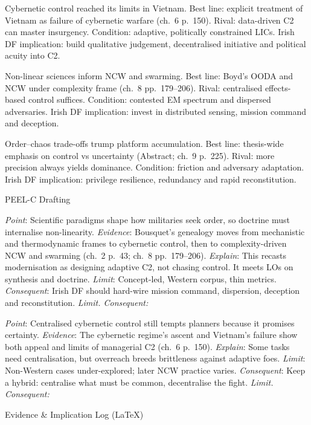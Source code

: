 Cybernetic control reached its limits in Vietnam.
Best line: explicit treatment of Vietnam as failure of cybernetic warfare (ch.~6 p.~150).
Rival: data-driven C2 can master insurgency.
Condition: adaptive, politically constrained LICs.
Irish DF implication: build qualitative judgement, decentralised initiative and political acuity into C2.

Non-linear sciences inform NCW and swarming.
Best line: Boyd’s OODA and NCW under complexity frame (ch.~8 pp.~179–206).
Rival: centralised effects-based control suffices.
Condition: contested EM spectrum and dispersed adversaries.
Irish DF implication: invest in distributed sensing, mission command and deception.

Order–chaos trade-offs trump platform accumulation.
Best line: thesis-wide emphasis on control vs uncertainty (Abstract; ch.~9 p.~225).
Rival: more precision always yields dominance.
Condition: friction and adversary adaptation.
Irish DF implication: privilege resilience, redundancy and rapid reconstitution.

PEEL-C Drafting

\textit{Point}: Scientific paradigms shape how militaries seek order, so doctrine must internalise non-linearity.
\textit{Evidence}: Bousquet’s genealogy moves from mechanistic and thermodynamic frames to cybernetic control, then to complexity-driven NCW and swarming (ch.~2 p.~43; ch.~8 pp.~179–206).
\textit{Explain}: This recasts modernisation as designing adaptive C2, not chasing control. It meets LOs on synthesis and doctrine.
\textit{Limit}: Concept-led, Western corpus, thin metrics.
\textit{Consequent}: Irish DF should hard-wire mission command, dispersion, deception and reconstitution.
\textit{Limit. Consequent:}

\textit{Point}: Centralised cybernetic control still tempts planners because it promises certainty.
\textit{Evidence}: The cybernetic regime’s ascent and Vietnam’s failure show both appeal and limits of managerial C2 (ch.~6 p.~150).
\textit{Explain}: Some tasks need centralisation, but overreach breeds brittleness against adaptive foes.
\textit{Limit}: Non-Western cases under-explored; later NCW practice varies.
\textit{Consequent}: Keep a hybrid: centralise what must be common, decentralise the fight.
\textit{Limit. Consequent:}

Evidence & Implication Log (LaTeX)

